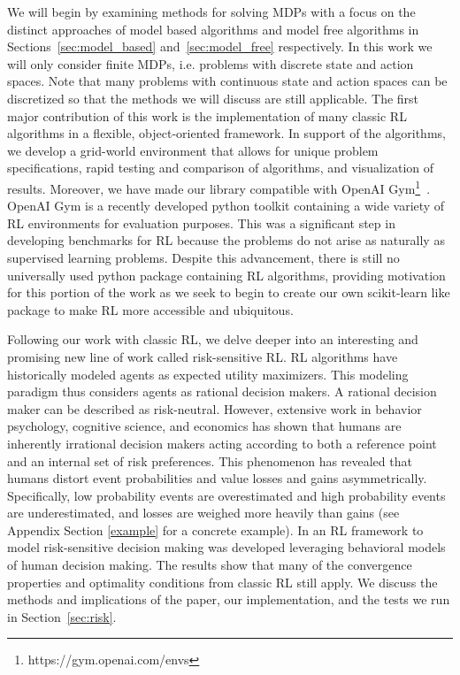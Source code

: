 \documentclass{article}
\begin{document}
We will begin by examining methods for solving MDPs with a focus on the distinct approaches of model based algorithms and model free algorithms in Sections~\ref{sec:model_based} and~\ref{sec:model_free} respectively. In this work we will only consider finite MDPs, i.e. problems with discrete state and action spaces. Note that many problems with continuous state and action spaces can be discretized so that the methods we will discuss are still applicable. The first major contribution of this work is the implementation of many classic RL algorithms in a flexible, object-oriented framework. In support of the algorithms, we develop a grid-world environment that allows for unique problem specifications, rapid testing and comparison of algorithms, and visualization of results. Moreover, we have made our library compatible with OpenAI Gym\footnote{https://gym.openai.com/envs}~\cite{DBLP:journals/corr/BrockmanCPSSTZ16}. OpenAI Gym is a recently developed python toolkit containing a wide variety of RL environments for evaluation purposes. This was a significant step in developing benchmarks for RL because the problems do not arise as naturally as supervised learning problems. Despite this advancement, there is still no universally used python package containing RL algorithms, providing motivation for this portion of the work as we seek to begin to create our own scikit-learn like package to make RL more accessible and ubiquitous.

Following our work with classic RL, we delve deeper into an interesting and promising new line of work called risk-sensitive RL. RL algorithms have historically modeled agents as expected utility maximizers. This modeling paradigm thus considers agents as rational decision makers. A rational decision maker can be described as risk-neutral. However, extensive work in behavior psychology, cognitive science, and economics has shown that humans are inherently irrational decision makers acting according to both a reference point and an internal set of risk preferences. This phenomenon has revealed that humans distort event probabilities and value losses and gains asymmetrically. Specifically, low probability events are overestimated and high probability events are underestimated, and losses are weighed more heavily than gains (see Appendix Section \ref{example} for a concrete example). In \cite{DBLP:journals/corr/ShenTSO13} an RL framework to model risk-sensitive decision making was developed leveraging behavioral models of human decision making. The results show that many of the convergence properties and optimality conditions from classic RL still apply. We discuss the methods and implications of the paper, our implementation, and the tests we run in Section~\ref{sec:risk}.
\end{document}
